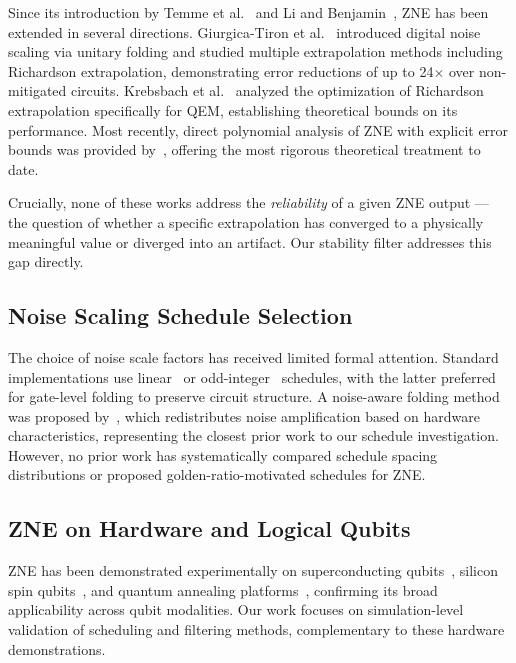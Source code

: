 \documentclass[twocolumn,showpacs,preprintnumbers,amsmath,amssymb,prl]{revtex4-2}
\begin{document}
Since its introduction by Temme et al.~\cite{Temme2017} and Li and
Benjamin~\cite{Li2017}, ZNE has been extended in several directions.
Giurgica-Tiron et al.~\cite{GiurgicaTiron2020} introduced digital noise
scaling via unitary folding and studied multiple extrapolation methods
including Richardson extrapolation, demonstrating error reductions of up
to 24$\times$ over non-mitigated circuits. Krebsbach et
al.~\cite{Krebsbach2022} analyzed the optimization of Richardson
extrapolation specifically for QEM, establishing theoretical bounds on
its performance. Most recently, direct polynomial analysis of ZNE with
explicit error bounds was provided by~\cite{DirectZNE2025}, offering
the most rigorous theoretical treatment to date.

Crucially, none of these works address the \emph{reliability} of a given
ZNE output — the question of whether a specific extrapolation has
converged to a physically meaningful value or diverged into an artifact.
Our stability filter addresses this gap directly.

\subsection{Noise Scaling Schedule Selection}

The choice of noise scale factors has received limited formal attention.
Standard implementations use linear~\cite{Temme2017} or
odd-integer~\cite{LaRose2022} schedules, with the latter preferred for
gate-level folding to preserve circuit structure. A noise-aware folding
method was proposed by~\cite{NoiseAwareFolding2024}, which redistributes
noise amplification based on hardware characteristics, representing the
closest prior work to our schedule investigation. However, no prior work
has systematically compared schedule spacing distributions or proposed
golden-ratio-motivated schedules for ZNE.

\subsection{ZNE on Hardware and Logical Qubits}

ZNE has been demonstrated experimentally on superconducting
qubits~\cite{NatComm2025ZNE}, silicon spin
qubits~\cite{PRA2025Silicon}, and quantum annealing
platforms~\cite{npjQI2025Annealing}, confirming its broad applicability
across qubit modalities. Our work focuses on simulation-level validation
of scheduling and filtering methods, complementary to these
hardware demonstrations.
\end{document}

